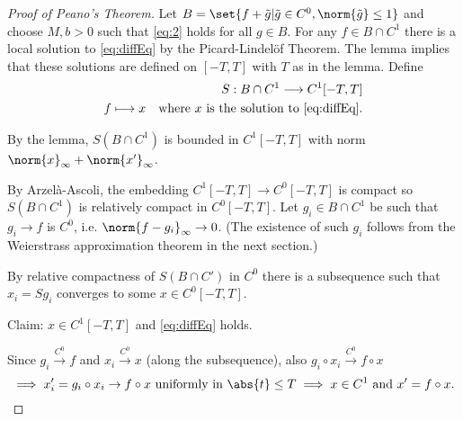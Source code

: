 \documentclass{article}
\begin{document}
\begin{proof}[Proof of Peano's Theorem]
    Let $B = \set{f + \tilde{g} | \tilde{g} \in C^0, \norm{\tilde{g}} \leq 1}$ and choose $M, b > 0$ such that \eqref{eq:2} holds for all $g \in B$.
    For any $f \in B \cap C^1$ there is a local solution to \eqref{eq:diffEq} by the Picard-Lindel\"of Theorem.
    The lemma implies that these solutions are defined on $[-T,T]$ with $T$ as in the lemma.
    Define
    \begin{align*}
        S:B \cap C^1 \longrightarrow C^1[-T, T] \\
        f \longmapsto x \quad \text{where $x$ is the solution to \eqref{eq:diffEq}.}
    \end{align*}

    By the lemma, $S(B \cap C^1)$ is bounded in $C^1[-T, T]$ with norm $\norm{x}_\infty + \norm{x'}_\infty$.

    By Arzel\`a-Ascoli, the embedding $C^1[-T, T] \to C^0 [-T, T]$ is compact so $S(B \cap C^1)$ is relatively compact in $C^0[-T, T]$.
    Let $g_i \in B \cap C^1$ be such that $g_i \to f$ is $C^0$, i.e. $\norm{f - g_i}_\infty \to 0$.
    (The existence of such $g_i$ follows from the Weierstrass approximation theorem in the next section.)

    By relative compactness of $S(B \cap C')$ in $C^0$ there is a subsequence such that $x_i = S g_i$ converges to some $x \in C^0[-T, T]$.

    Claim: $x \in C^1[-T, T]$ and \eqref{eq:diffEq} holds.

    Since $g_i \xrightarrow{C^0} f$ and $x_i \xrightarrow{C^0} x$ (along the subsequence), also $g_i \circ x_i \xrightarrow{C^0} f \circ x$
    \begin{equation*}
        \implies x_i' = g_i \circ x_i \to f \circ x \text{ uniformly in } \abs{t} \leq T \\
        \implies x \in C^1 \text{ and } x' = f \circ x.
    \end{equation*}
\end{proof}
\end{document}
